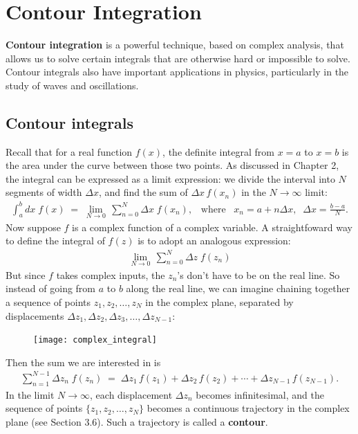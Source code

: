 \documentclass[10pt,a4paper]{article}
\begin{document}
\setcounter{page}{61}

\section{Contour Integration}
\label{contour-integration}

\textbf{Contour integration} is a powerful technique, based on complex
analysis, that allows us to solve certain integrals that are otherwise
hard or impossible to solve.  Contour integrals also have important
applications in physics, particularly in the study of waves and
oscillations.

\subsection{Contour integrals}
\label{contour-integrals}

Recall that for a real function $f(x)$, the definite integral from
$x=a$ to $x=b$ is the area under the curve between those two
points. As discussed in Chapter 2, the integral can be expressed as a
limit expression: we divide the interval into $N$ segments of width
$\Delta x$, and find the sum of $\Delta x\, f(x_n)$ in the $N
\rightarrow \infty$ limit:
\begin{align}
  \int_a^b dx\; f(x) \;=\; \lim_{N \rightarrow 0} \, \sum_{n=0}^{N} \Delta x\; f(x_n), \;\;\;\mathrm{where}\;\;\;x_n = a + n\Delta x, \;\;\Delta x = \frac{b-a}{N}.
\end{align}
Now suppose $f$ is a complex function of a complex variable. A
straightfoward way to define the integral of $f(z)$ is to adopt an
analogous expression:
\begin{align*}
  \lim_{N \rightarrow 0} \, \sum_{n=0}^{N} \Delta z\; f(z_n)
\end{align*}
But since $f$ takes complex inputs, the $z_n$'s don't have to be on
the real line. So instead of going from $a$ to $b$ along the real
line, we can imagine chaining together a sequence of points $z_1, z_2,
\dots, z_N$ in the complex plane, separated by displacements $\Delta
z_1, \Delta z_2, \Delta z_3, \dots, \Delta z_{N-1}$:

\begin{figure}[ht]
  \centering\texttt{[image: complex\_integral]}
\end{figure}

\noindent
Then the sum we are interested in is
\begin{align}
  \sum_{n=1}^{N-1} \Delta z_n\; f(z_n) \;=\; \Delta z_1\, f(z_1) + \Delta z_2\, f(z_2) + \cdots + \Delta z_{N-1}\, f(z_{N-1}).
\end{align}
In the limit $N \rightarrow \infty$, each displacement $\Delta z_{n}$
becomes infinitesimal, and the sequence of points $\{z_1, z_2, \dots,
z_N\}$ becomes a continuous trajectory in the complex plane (see
Section 3.6). Such a trajectory is called a \textbf{contour}.
\end{document}
